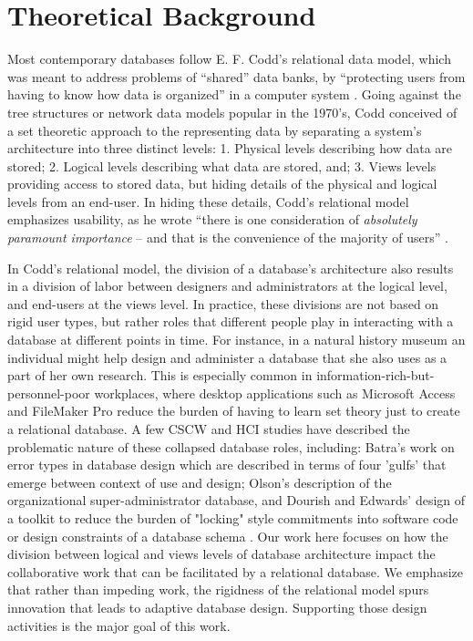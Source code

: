 \section{Theoretical Background}
Most contemporary databases follow E. F. Codd's relational data model, which was meant to address problems of “shared” data banks, by  “protecting users from having to know how data is organized” in a computer system  \cite[p. 377]{Codd_1970}. Going against the tree structures or network data models popular in the 1970's, Codd conceived of a set theoretic approach to the representing data by separating a system's architecture into three distinct levels: 1. Physical levels describing how data are stored; 2. Logical levels describing what data are stored, and; 3. Views levels providing access to stored data, but hiding details of the physical and logical levels from an end-user. In hiding these details, Codd's relational model emphasizes usability, as he wrote “there is one consideration of \emph{absolutely paramount importance} – and that is the convenience of the majority of users” \cite[p.2]{Codd_1971}.

In Codd's relational model, the division of a database's architecture also results in a division of labor between designers and administrators at the logical level, and end-users at the views level. In practice, these divisions are not based on rigid user types, but rather roles that different people play in interacting with a database at different points in time. For instance, in a natural history museum an individual might help design and administer a database that she also uses as a part of her own research. This is especially common in information-rich-but-personnel-poor workplaces, where desktop applications such as Microsoft Access and FileMaker Pro reduce the burden of having to learn set theory just to create a relational database. A few CSCW and HCI studies have described the problematic nature of these collapsed database roles, including: Batra's work on error types in database design \cite{Batra_1993} which are described in terms of  four 'gulfs' that emerge between context of use and design; Olson's description of the organizational super-administrator \cite{olson2010} database, and Dourish and Edwards' design of a toolkit to reduce the burden of "locking" style commitments into software code or design constraints of a database schema \cite{Dourish_2000}. Our work here focuses on how the division between logical and views levels of database architecture impact the collaborative work that can be facilitated by a relational database. We emphasize that rather than impeding work, the rigidness of the relational model spurs innovation that leads to adaptive database design. Supporting those design activities is the major goal of this work. 

